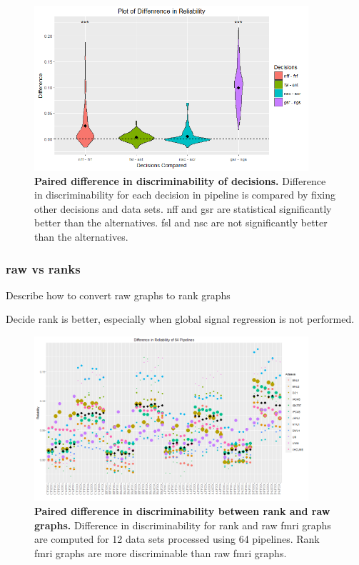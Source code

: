 \documentclass{article}
\begin{document}
\begin{figure}[ht!]
	\includegraphics[width=4.0in]{../Figs/Differ_violin_mean.png}
	\caption{{ \bf Paired difference in discriminability of decisions.} Difference in discriminability for each decision in pipeline is compared by fixing other decisions and data sets. nff and gsr are statistical significantly better than the alternatives. fsl and nsc are not significantly better than the alternatives.}
	\label{fig:7}
\end{figure}

\subsubsection{raw vs ranks}
 Describe how to convert raw graphs to rank graphs

 Decide rank is better, especially when global signal regression is not performed.
\begin{figure}[ht!]
	\includegraphics[width=4.0in]{../Figs/64_pipelines_differ.png}
	\caption{{ \bf Paired difference in discriminability between rank and raw graphs.} Difference in discriminability for rank and raw fmri graphs are computed for 12 data sets processed using 64 pipelines. Rank fmri graphs are more discriminable than raw fmri graphs.}
	\label{fig:7}
\end{figure}
\end{document}
